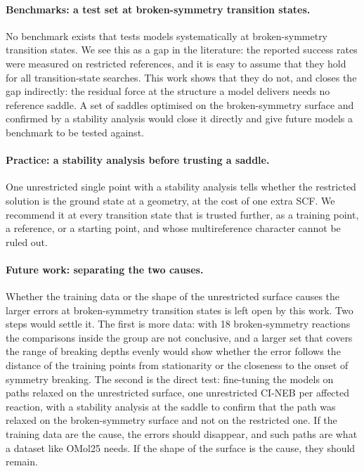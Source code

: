\paragraph{Benchmarks: a test set at broken-symmetry transition states.}
No benchmark exists that tests models systematically at
broken-symmetry transition states. We see this as a gap in the
literature: the reported success
rates were measured on restricted references, and it is easy to assume
that they hold for all transition-state searches.
This work shows that they do not, and closes the gap indirectly: the
residual force at the structure a model delivers needs no reference
saddle. A set of saddles optimised on the broken-symmetry
surface and confirmed by a stability analysis would close it directly
and give future models a benchmark to be tested against.

\paragraph{Practice: a stability analysis before trusting a saddle.} One unrestricted single point with a
stability analysis tells whether the restricted solution is the ground
state at a geometry, at the cost of one extra SCF. We recommend it at
every transition state that is trusted further, as a training point,
a reference, or a starting point, and whose multireference character
cannot be ruled out.

\paragraph{Future work: separating the two causes.} Whether the
training data or the shape of the unrestricted surface causes the
larger errors at broken-symmetry transition states is left open by this
work. Two steps would settle it. The first is more data: with 18
broken-symmetry reactions the comparisons inside the group are not
conclusive, and a larger set that covers the range of breaking depths
evenly would show whether the error follows the distance of the
training points from stationarity or the closeness to the onset of
symmetry breaking. The second is the direct test: fine-tuning the
models on paths relaxed on the unrestricted surface, one unrestricted
CI-NEB per affected reaction, with a stability analysis at the saddle
to confirm that the path was relaxed on the broken-symmetry surface and
not on the restricted one. If the training data are the cause, the
errors should disappear, and such paths are what a dataset like OMol25
needs. If the shape of the surface is the cause, they should remain.

